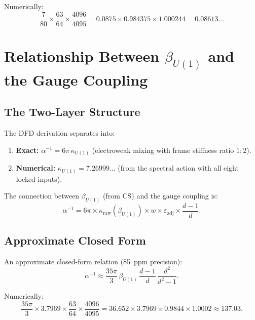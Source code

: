 \documentclass[12pt,a4paper]{article}
\begin{document}
Numerically:
\begin{equation}
\frac{7}{80} \times \frac{63}{64} \times \frac{4096}{4095}
= 0.0875 \times 0.984375 \times 1.000244
= 0.08613\ldots
\end{equation}

\section{Relationship Between $\beta_{U(1)}$ and the Gauge Coupling}
\label{sec:beta-coupling}

\subsection{The Two-Layer Structure}

The DFD derivation separates into:
\begin{enumerate}
\item \textbf{Exact:} $\alpha^{-1} = 6\pi\,\kappa_{U(1)}$
(electroweak mixing with frame stiffness ratio $1:2$).
\item \textbf{Numerical:} $\kappa_{U(1)} = 7.26999\ldots$
(from the spectral action with all eight locked inputs).
\end{enumerate}

The connection between $\beta_{U(1)}$ (from CS) and the gauge coupling
is:
\begin{equation}\label{eq:beta-to-alpha}
\alpha^{-1} = 6\pi \times \kappa_{\mathrm{raw}}(\beta_{U(1)})
\times w \times \varepsilon_{\mathrm{adj}} \times \frac{d-1}{d}.
\end{equation}

\subsection{Approximate Closed Form}

An approximate closed-form relation (85~ppm precision):
\begin{equation}\label{eq:approximate}
\alpha^{-1} \approx \frac{35\pi}{3}\,\beta_{U(1)}\,
\frac{d-1}{d}\,\frac{d^2}{d^2-1}.
\end{equation}

Numerically:
\begin{equation}
\frac{35\pi}{3} \times 3.7969 \times \frac{63}{64} \times \frac{4096}{4095}
= 36.652 \times 3.7969 \times 0.9844 \times 1.0002
\approx 137.03.
\end{equation}
\end{document}
